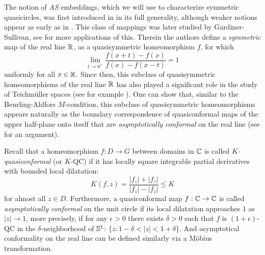 \documentclass[11pt]{amsart}
\numberwithin{equation}{section}
\theoremstyle{plain}
\theoremstyle{step}
\def\leq{\leqslant}
\newcommand{\Ss}{\Bbb{S}^1}
\newcommand{\R}{\Bbb{R}}
\newcommand{\C}{\Bbb{C}}
\renewcommand{\bar}[1]{\overline{#1}}
\begin{document}
The notion of \textit{AS} embeddings, which we will use to characterize symmetric quasicircles, was first introduced in \cite{brania2004asymptotically} in its full generality, although weaker notions appear as early as in \cite{MR215986}. This class of mappings was later studied by Gardiner-Sullivan, see \cite{gardiner1992symmetric} for more applications of this. Therein the authors define a \textit{symmetric} map of the real line $\R$, as a quasisymmetric homeomorphism $f$, for which 
\[
\lim_{t\to0^+}\frac{f(x+t)-f(x)}{f(x)-f(x-t)}=1
\]
uniformly for all $x\in \R.$ Since then, this subclass of quasisymmetric homeomorphisms of the real line $\R$ has also played a significant role in the study of Teichm\"uller spaces (see for example \cite{MR3834655}). One can show that, similar to the Beurling-Ahlfors $M$-condition, this subclass of quasisymmetric homeomorphisms appears naturally as the boundary correspondence of quasiconformal maps of the upper half-plane onto itself that are {\it asymptotically conformal} on the real line (see \cite{MR2560683} for an argument). 

Recall that a homeomorphism $f: D\rightarrow G$ between domains in $\C$ is called {\it $K$-quasiconformal} (or $K$-QC) if it has locally square integrable partial derivatives with bounded local dilatation:
\[
K(f,z)=\frac{|f_z|+|f_{\bar{z}}|}{|f_z|-|f_{\bar{z}}|}\leq K
\]
for almost all $z\in D$. Furthermore, a quasiconformal map $f:\C\rightarrow\C$ is called {\it asymptotically conformal} on the unit circle if its local dilatation approaches $1$ as $|z|\rightarrow 1$, more precisely, if for any 
$\epsilon>0$ there exists $\delta>0$ such that $f$ is $(1+\epsilon)$-QC in the $\delta$-neighborhood of $\Ss$: $\{z: 1-\delta<|z|<1+\delta\}$. 
And asymptotical conformality on the real line can be defined similarly via a M\"obius transformation. 
\end{document}
